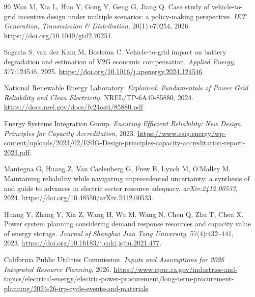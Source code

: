 \begin{thebibliography}{99}
Wan M, Xia L, Huo Y, Gong Y, Geng G, Jiang Q.
\newblock Case study of vehicle-to-grid incentive design under multiple
scenarios: a policy-making perspective.
\newblock \emph{IET Generation, Transmission \& Distribution},
20(1):e70254, 2026.
\newblock \url{https://doi.org/10.1049/gtd2.70254}.

Sagaria S, van der Kam M, Boström C.
\newblock Vehicle-to-grid impact on battery degradation and estimation of V2G
economic compensation.
\newblock \emph{Applied Energy}, 377:124546, 2025.
\newblock \url{https://doi.org/10.1016/j.apenergy.2024.124546}.

National Renewable Energy Laboratory.
\newblock \emph{Explained: Fundamentals of Power Grid Reliability and Clean
Electricity}. NREL/TP-6A40-85880, 2024.
\newblock \url{https://docs.nrel.gov/docs/fy24osti/85880.pdf}.

Energy Systems Integration Group.
\newblock \emph{Ensuring Efficient Reliability: New Design Principles for
Capacity Accreditation}, 2023.
\newblock \url{https://www.esig.energy/wp-content/uploads/2023/02/ESIG-Design-principles-capacity-accreditation-report-2023.pdf}.

Mantegna G, Huang Z, Van Caelenberg G, Frew B, Lynch M, O'Malley M.
\newblock Maintaining reliability while navigating unprecedented uncertainty:
a synthesis of and guide to advances in electric sector resource adequacy.
\newblock \emph{arXiv:2412.00533}, 2024.
\newblock \url{https://doi.org/10.48550/arXiv.2412.00533}.

Huang Y, Zhang Y, Xia Z, Wang H, Wu M, Wang N, Chen Q, Zhu T, Chen X.
\newblock Power system planning considering demand response resources and
capacity value of energy storage.
\newblock \emph{Journal of Shanghai Jiao Tong University},
57(4):432--441, 2023.
\newblock \url{https://doi.org/10.16183/j.cnki.jsjtu.2021.477}.

California Public Utilities Commission.
\newblock \emph{Inputs and Assumptions for 2026 Integrated Resource Planning},
2026.
\newblock \url{https://www.cpuc.ca.gov/industries-and-topics/electrical-energy/electric-power-procurement/long-term-procurement-planning/2024-26-irp-cycle-events-and-materials}.

\end{thebibliography}
